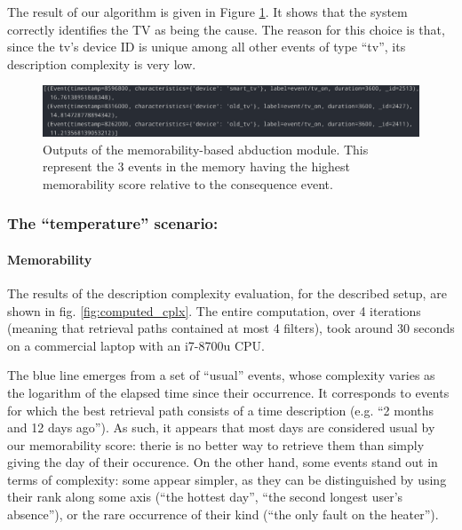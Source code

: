 \documentclass[entropy,article,submit,moreauthors,pdftex]{Definitions/mdpi}
\begin{document}
The result of our algorithm is given in Figure \ref{fig:abduction_res}. It shows that the system correctly identifies the TV as being the cause. The reason for this choice is that, since the tv's device ID is unique among all other events of type ``tv'', its description complexity is very low.

\begin{figure}
    \centering
    \includegraphics[width=.8\linewidth]{./figures/abduction_1_results}
    \caption{Outputs of the memorability-based abduction module. This represent the 3 events in the memory having the highest memorability score relative to the consequence event.}
    \label{fig:abduction_res}
\end{figure}

\subsubsection{The ``temperature'' scenario:}
\paragraph{Memorability}

The results of the description complexity evaluation, for the described setup,
are shown in fig. \ref{fig:computed_cplx}. The entire computation, over 4
iterations (meaning that retrieval paths contained at most 4 filters), took
around 30 seconds on a commercial laptop with an i7-8700u CPU.

The blue line emerges from a set of ``usual'' events, whose complexity varies as the logarithm of
the elapsed time since their occurrence. It corresponds to events
for which the best retrieval path consists of a time description (e.g. ``2
months and 12 days ago''). As such, it appears that most days are considered usual by our memorability score: therie is no better way to retrieve them than simply giving the day of their occurence. On the other hand, some events stand out in terms of
complexity: some appear simpler, as they can be distinguished by using their
rank along some axis (``the hottest day'', ``the second longest user's
absence''), or the rare occurrence of their kind (``the only fault on the heater'').
\end{document}
